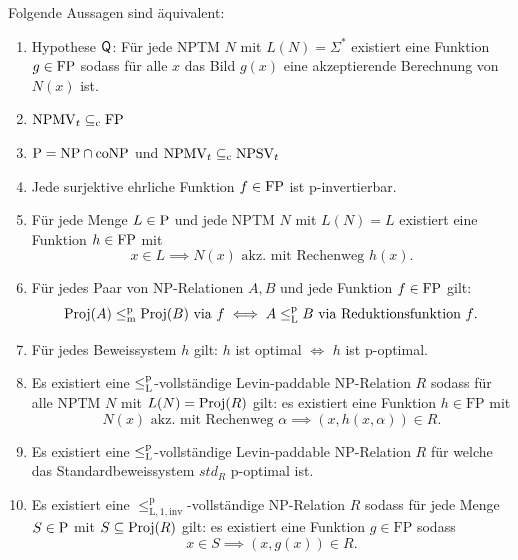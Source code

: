 \begin{theorem}\label{thm:q}
    Folgende Aussagen sind äquivalent:
    \begin{enumerate}
        \item Hypothese $\hQ$: Für jede NPTM $N$ mit $L(N)=\Sigma^*$ existiert eine Funktion $g\in\FP$ sodass für alle $x$ das Bild $g(x)$ eine akzeptierende Berechnung von $N(x)$ ist.
        \item $\mathrm{NPMV}_t\subseteqc \mathrm{FP}$
        \item $\P=\NP\cap\coNP$ und $\mathrm{NPMV}_t\subseteqc \mathrm{NPSV}_t$
        \item Jede surjektive ehrliche Funktion $f\in\FP$ ist p-invertierbar. %
        \item Für jede Menge $L\in \P$  und jede NPTM $N$ mit $L(N)=L$ existiert eine Funktion $h\in \FP$ mit 
            \[ x\in L \implies N(x) \text{ akz. mit Rechenweg $h(x)$}. \]
        \item Für jedes Paar von NP-Relationen $A, B$ und jede Funktion $f\in\FP$ gilt:
            \[ \Proj(A) \leqmp \Proj(B) \text{ via $f$} \iff A \leqlp B \text{ via Reduktionsfunktion $f$}. \]
        \item Für jedes Beweissystem $h$ gilt: $h$ ist optimal $\iff$ $h$ ist p-optimal. 
        \item Es existiert eine $\leqlp$-vollständige Levin-paddable NP-Relation $R$ sodass für alle NPTM $N$ mit $L(N)=\Proj(R)$ gilt: es existiert eine Funktion $h\in\mathrm{FP}$ mit
            \[ N(x) \text{ akz. mit Rechenweg $\alpha$} \implies (x,h(x,\alpha))\in R. \]
        \item Es existiert eine $\leqlp$-vollständige Levin-paddable NP-Relation $R$ für welche das Standardbeweissystem $\mathit{std}_R$ p-optimal ist.
        \item Es existiert eine $\leq_\mathrm{L,1,inv}^\mathrm p$-vollständige NP-Relation $R$ sodass für jede Menge $S\in \P$ mit $S\subseteq \Proj(R)$ gilt: es existiert eine Funktion $g\in\mathrm{FP}$ sodass
            \[ x\in S \implies (x, g(x))\in R. \]
    \end{enumerate}
\end{theorem}
